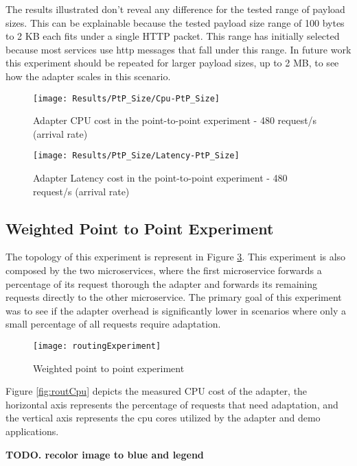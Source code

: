 The results illustrated don't reveal any difference for the tested range of payload sizes.
This can be explainable because the tested payload size range of 100 bytes to 2 KB each fits under a single HTTP packet.
This range has initially selected because most services use http messages that fall under this range.
In future work this experiment should be repeated for larger payload sizes, up to 2 MB, to see how the adapter scales in this scenario.

\begin{figure}[htbp]
    \centering
    \centerline{\texttt{[image: Results/PtP\_Size/Cpu-PtP\_Size]}}
    \caption{Adapter CPU cost in the point-to-point experiment - 480 request/s (arrival rate)}
    \label{fig:payloadCpuPtP}
\end{figure}

\begin{figure}[htbp]
    \centering
    \centerline{\texttt{[image: Results/PtP\_Size/Latency-PtP\_Size]}}
    \caption{Adapter Latency cost in the point-to-point experiment - 480 request/s (arrival rate)}
    \label{fig:payloadLatPtP}
\end{figure}

\subsection{Weighted Point to Point Experiment}

The topology of this experiment is represent in Figure \ref{fig:routExp}.
This experiment is also composed by the two microservices, where the first microservice forwards a percentage of its request thorough the adapter
and forwards its remaining requests directly to the other microservice.
The primary goal of this experiment was to see if the adapter overhead is significantly lower in scenarios where only a small percentage of all requests require adaptation.

\begin{figure}[htbp]
    \centering
    \centerline{\texttt{[image: routingExperiment]}}
    \caption{Weighted point to point experiment}
    \label{fig:routExp}
\end{figure}

Figure \ref{fig:routCpu} depicts the measured CPU cost of the adapter, the horizontal axis represents the percentage of requests that need adaptation, and the vertical axis represents the
cpu cores utilized by the adapter and demo applications.

\textbf{TODO. recolor image to blue and legend}

